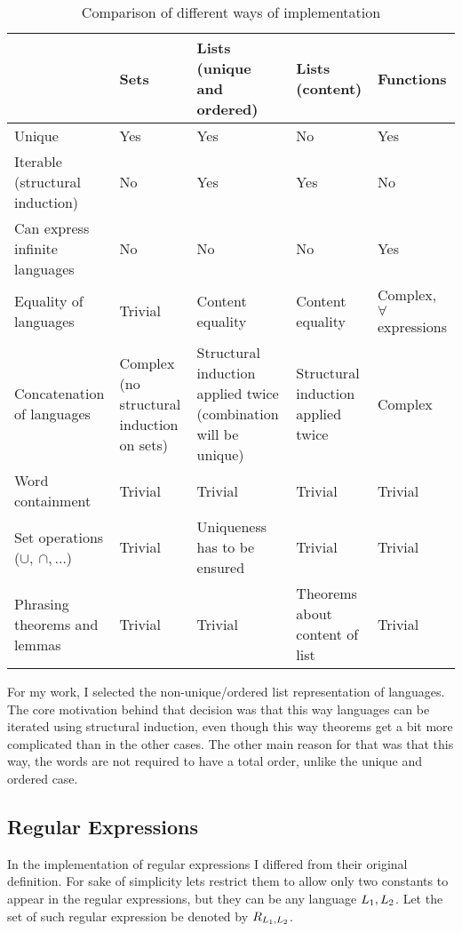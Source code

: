 \renewcommand{\arraystretch}{1.5}
\begin{center}
	\begin{table}
		\begin{tabular}{| p{3cm} | p{3cm} | p{3cm}| p{3cm} | p{3cm} |}
			
			\hline
			& Sets & Lists (unique and ordered) & Lists (content) & Functions \\ \hline
			Unique & Yes & Yes & No & Yes \\ \hline
			Iterable (structural induction) & No & Yes & Yes & No \\ \hline
			Can express infinite languages & No & No & No & Yes \\ \hline
			Equality of languages & Trivial & Content equality & Content equality & Complex, $\forall$ expressions \\ \hline
			Concatenation of languages & Complex (no structural induction on sets) & Structural induction applied twice (combination will be unique) & Structural induction applied twice & Complex \\ \hline
			Word containment & Trivial & Trivial & Trivial & Trivial \\ \hline
			Set operations ($\cup, ~ \cap, \ldots$) & Trivial & Uniqueness has to be ensured & Trivial & Trivial \\ \hline
			Phrasing theorems and lemmas & Trivial & Trivial & Theorems about content of list & Trivial \\ \hline
		\end{tabular}		
		\caption{\label{tab:implComparison}Comparison of different ways of implementation}
	\end{table}

\end{center}

For my work, I selected the non-unique/ordered list representation of languages. The core motivation behind that decision was that this way languages can be iterated using structural induction, even though this way theorems get a bit more complicated than in the other cases. The other main reason for that was that this way, the words are not required to have a total order, unlike the unique and ordered case.

\subsection{Regular Expressions}
\label{sect:regExImpl}

In the implementation of regular expressions I differed from their original definition. For sake of simplicity lets restrict them to allow only two constants to appear in the regular expressions, but they can be any language $L_{1}, L_{2}$. Let the set of such regular expression be denoted by $R_{L_{1}, L_{2}}$.

